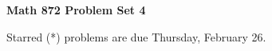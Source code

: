 \documentclass[12pt]{article}
\begin{document}
\def\ctln{\centerline}
\def\msk{\medskip}
\def\bsk{\bigskip}
\def\ssk{\smallskip}
\def\hsk{\hskip.3in}
\def\ra{\rightarrow}
\def\ubr{\underbar}

\def\mt{{\mathcal T}}
\def\mb{{\mathcal B}}
\def\ms{{\mathcal S}}
\def\mu{{\mathcal U}}
\def\mv{{\mathcal V}}

\def\bbr{{\mathbb R}}
\def\bbz{{\mathbb Z}}
\def\bbq{{\mathbb Q}}
\def\spc{$~$\hskip.15in$~$}

\def\sset{\subseteq}
\def\del{\partial}
\def\lra{$\Leftrightarrow$}
\def\bra{$\Rightarrow$}
\def\wtl{\widetilde}



\ctln{\bf Math 872 Problem Set 4}

\msk

Starred (*) problems are due Thursday, February 26.
\end{document}
